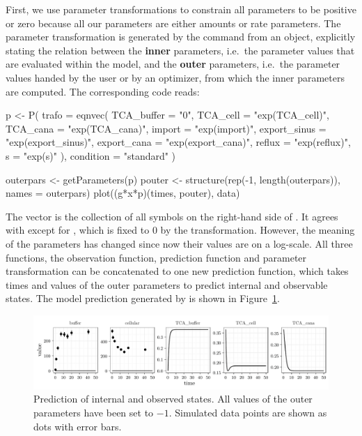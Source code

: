 \documentclass[article]{jss}
\begin{document}
First, we use parameter transformations to constrain all parameters to be positive or zero because all our parameters are either amounts or rate parameters. The parameter transformation is generated by the  command from an  object, explicitly stating the relation between the \textbf{inner} parameters, i.e.~the parameter values that are evaluated within the model, and the \textbf{outer} parameters, i.e.~the parameter values handed by the user or by an optimizer, from which the inner parameters are computed. The corresponding code reads:
\begin{CodeChunk}
\begin{CodeInput}
p <- P(
  trafo = eqnvec(
    TCA_buffer = "0",
    TCA_cell = "exp(TCA_cell)",
    TCA_cana = "exp(TCA_cana)",
    import = "exp(import)",
    export_sinus = "exp(export_sinus)",
    export_cana = "exp(export_cana)",
    reflux = "exp(reflux)",
    s = "exp(s)"
  ),
  condition = "standard"
)

outerpars <- getParameters(p)
pouter <- structure(rep(-1, length(outerpars)), names = outerpars)
plot((g*x*p)(times, pouter), data)
\end{CodeInput}
\end{CodeChunk}
The vector  is the collection of all symbols on the right-hand side of . It agrees with  except for , which is fixed to 0 by the transformation. However, the meaning of the parameters has changed since now their values are on a log-scale. All three functions, the observation function, prediction function and parameter transformation can be concatenated to one new prediction function,  which takes times and values of the outer parameters to predict internal and observable states. The model prediction generated by  is shown in Figure~\ref{fig:gxp}.
\begin{figure}[ht]
	\centering
	\includegraphics[width = \textwidth]{images/figure3}
	\caption{Prediction of internal and observed states. All values of the outer parameters have been set to $-1$. Simulated data points are shown as dots with error bars.}
	\label{fig:gxp}
\end{figure}
\end{document}
